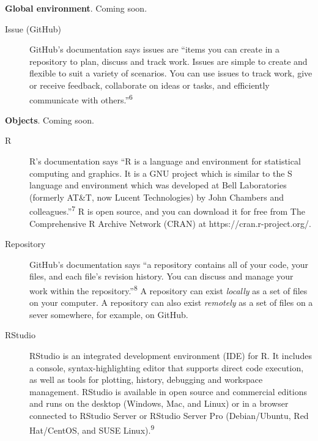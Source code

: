 \documentclass[
  letterpaper,
  DIV=11,
  numbers=noendperiod]{scrreprt}
\begin{document}
\textbf{Global environment}. Coming soon.

\begin{description}
\item[\label{glossary-issue}{Issue (GitHub)}]
GitHub's documentation says issues are ``items you can create in a
repository to plan, discuss and track work. Issues are simple to create
and flexible to suit a variety of scenarios. You can use issues to track
work, give or receive feedback, collaborate on ideas or tasks, and
efficiently communicate with others.''\textsuperscript{6}
\end{description}

\textbf{Objects}. Coming soon.

\begin{description}
\item[\label{glossary-r}{R}]
R's documentation says ``R is a language and environment for statistical
computing and graphics. It is a GNU project which is similar to the S
language and environment which was developed at Bell Laboratories
(formerly AT\&T, now Lucent Technologies) by John Chambers and
colleagues.''\textsuperscript{7} R is open source, and you can download
it for free from The Comprehensive R Archive Network (CRAN) at
https://cran.r-project.org/.
\item[\label{glossary-repository}{Repository}]
GitHub's documentation says ``a repository contains all of your code,
your files, and each file's revision history. You can discuss and manage
your work within the repository.''\textsuperscript{8} A repository can
exist \emph{locally} as a set of files on your computer. A repository
can also exist \emph{remotely} as a set of files on a sever somewhere,
for example, on GitHub.
\item[\label{glossary-rstudio}{RStudio}]
RStudio is an integrated development environment (IDE) for R. It
includes a console, syntax-highlighting editor that supports direct code
execution, as well as tools for plotting, history, debugging and
workspace management. RStudio is available in open source and commercial
editions and runs on the desktop (Windows, Mac, and Linux) or in a
browser connected to RStudio Server or RStudio Server Pro
(Debian/Ubuntu, Red Hat/CentOS, and SUSE Linux).\textsuperscript{9}
\end{description}
\end{document}
